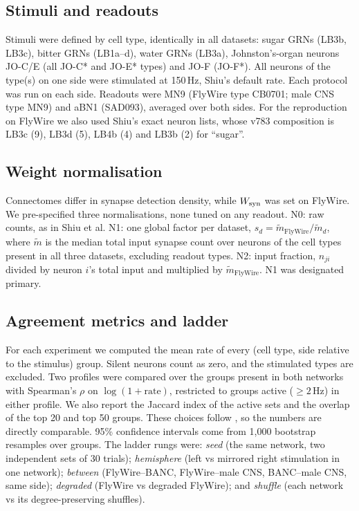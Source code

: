\subsection*{Stimuli and readouts}
Stimuli were defined by cell type, identically in all datasets: sugar GRNs (LB3b, LB3c),
bitter GRNs (LB1a--d), water GRNs (LB3a), Johnston's-organ neurons JO-C/E (all JO-C* and
JO-E* types) and JO-F (JO-F*). All neurons of the type(s) on one side were stimulated at
150\,Hz, Shiu's default rate. Each protocol was run on each side. Readouts were MN9 (FlyWire
type CB0701; male CNS type MN9) and aBN1 (SAD093), averaged over both sides. For the
reproduction on FlyWire we also used Shiu's exact neuron lists, whose v783 composition is
LB3c (9), LB3d (5), LB4b (4) and LB3b (2) for ``sugar''.

\subsection*{Weight normalisation}
Connectomes differ in synapse detection density, while $W_{\mathrm{syn}}$ was set on FlyWire. We
pre-specified three normalisations, none tuned on any readout. N0: raw counts, as in Shiu et
al. N1: one global factor per dataset, $s_d = \tilde{m}_{\mathrm{FlyWire}}/\tilde{m}_d$,
where $\tilde{m}$ is the median total input synapse count over neurons of the cell types
present in all three datasets, excluding readout types. N2: input fraction, $n_{ji}$ divided
by neuron $i$'s total input and multiplied by $\tilde{m}_{\mathrm{FlyWire}}$. N1 was
designated primary.

\subsection*{Agreement metrics and ladder}
For each experiment we computed the mean rate of every (cell type, side relative to the
stimulus) group. Silent neurons count as zero, and the stimulated types are excluded. Two
profiles were compared over the groups present in both networks with Spearman's $\rho$ on
$\log(1+\mathrm{rate})$, restricted to groups active ($\ge2$\,Hz) in either profile. We also
report the Jaccard index of the active sets and the overlap of the top 20 and top 50 groups.
These choices follow \citep{santos2026}, so the numbers are directly comparable. 95\%
confidence intervals come from 1{,}000 bootstrap resamples over groups. The ladder rungs were:
\emph{seed} (the same network, two independent sets of 30 trials); \emph{hemisphere} (left vs
mirrored right stimulation in one network); \emph{between} (FlyWire--BANC, FlyWire--male CNS,
BANC--male CNS, same side); \emph{degraded} (FlyWire vs degraded FlyWire); and \emph{shuffle}
(each network vs its degree-preserving shuffles).

